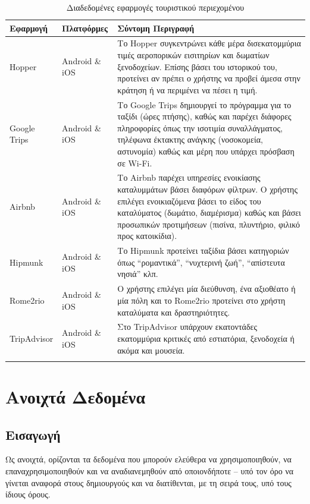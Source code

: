 \documentclass[oneside, 12pt]{book}
\begin{document}
\begin{longtable}{|p{}|p{}|p{}|}
\hline
Εφαρμογή & Πλατφόρμες & Σύντομη Περιγραφή\\
\hline
Hopper & Android \& iOS & Το Hopper συγκεντρώνει κάθε μέρα 
δισεκατομμύρια τιμές αεροπορικών εισιτηρίων και δωματίων ξενοδοχείων. 
Επίσης βάσει του ιστορικού του, προτείνει αν πρέπει ο χρήστης να 
προβεί άμεσα στην κράτηση ή να περιμένει να πέσει η τιμή. \\
\hline
Google Trips & Android \& iOS & Το Google Trips δημιουργεί το 
πρόγραμμα για το ταξίδι (ώρες πτήσης), καθώς και παρέχει διάφορες 
πληροφορίες όπως την ισοτιμία συναλλάγματος, τηλέφωνα έκτακτης ανάγκης 
(νοσοκομεία, αστυνομία) καθώς και μέρη που υπάρχει πρόσβαση σε Wi-Fi.\\
\hline
Airbnb & Android \& iOS & Το Airbnb παρέχει υπηρεσίες ενοικίασης 
καταλυμμάτων βάσει διαφόρων φίλτρων. Ο χρήστης επιλέγει ενοικιαζόμενα βάσει το είδος του καταλύματος (δωμάτιο, διαμέρισμα) καθώς και βάσει προσωπικών προτιμήσεων (πισίνα, πλυντήριο, φιλικό προς κατοικίδια).\\ 
\hline
Hipmunk & Android \& iOS & Το Hipmunk προτείνει ταξίδια βάσει
κατηγοριών όπως ``ρομαντικά'', ``νυχτερινή ζωή'', ``απίστευτα νησιά'' κλπ.\\
\hline
Rome2rio & Android \& iOS & Ο χρήστης επιλέγει μία διεύθυνση, ένα 
αξιοθέατο ή μία πόλη και το Rome2rio προτείνει στο χρήστη καταλύματα 
και δραστηριότητες.\\
\hline
TripAdvisor & Android \& iOS & Στο TripAdvisor υπάρχουν εκατοντάδες 
εκατομμύρια κριτικές από εστιατόρια, ξενοδοχεία ή ακόμα και μουσεία.\\
\hline
\caption{Διαδεδομένες εφαρμογές τουριστικού περιεχομένου}
\label{table:famous_tourist_relevant_apps}
\end{longtable}


\chapter{Ανοιχτά Δεδομένα}
\section{Εισαγωγή}
Ως ανοιχτά, ορίζονται τα δεδομένα που μπορούν ελεύθερα να 
χρησιμοποιηθούν, να επαναχρησιμοποιηθούν και να αναδιανεμηθούν από 
οποιονδήποτε – υπό τον όρο να γίνεται αναφορά στους δημιουργούς και να διατίθενται, με τη σειρά τους, υπό τους ίδιους όρους.
\end{document}
